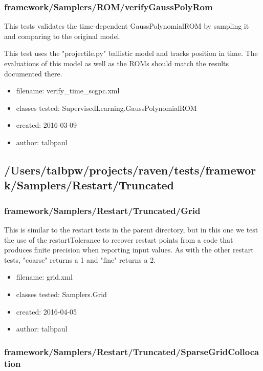     \subsubsection{framework/Samplers/ROM/verifyGaussPolyRom}
      
      This tests validates the time-dependent GaussPolynomialROM by sampling it and comparing to the original model.
    

      
      This test uses the "projectile.py" ballistic model and tracks position in time.  The evaluations of this model
      as well as the ROMs should match the results documented there.
    
      \begin{itemize}
          \item filename: verify\_time\_scgpc.xml
          \item classes tested: SupervisedLearning.GaussPolynomialROM
          \item created: 2016-03-09
          \item author: talbpaul
      \end{itemize}
  \subsection{/Users/talbpw/projects/raven/tests/framework/Samplers/Restart/Truncated}
    \subsubsection{framework/Samplers/Restart/Truncated/Grid}
      
      This is similar to the restart tests in the parent directory, but in this one we test the use of the
      restartTolerance to recover restart points from a code that produces finite precision when reporting input
      values.  As with the other restart tests, "coarse" returns a 1 and "fine" returns a 2.
    
      \begin{itemize}
          \item filename: grid.xml
          \item classes tested: Samplers.Grid
          \item created: 2016-04-05
          \item author: talbpaul
      \end{itemize}
    \subsubsection{framework/Samplers/Restart/Truncated/SparseGridCollocation}
      
